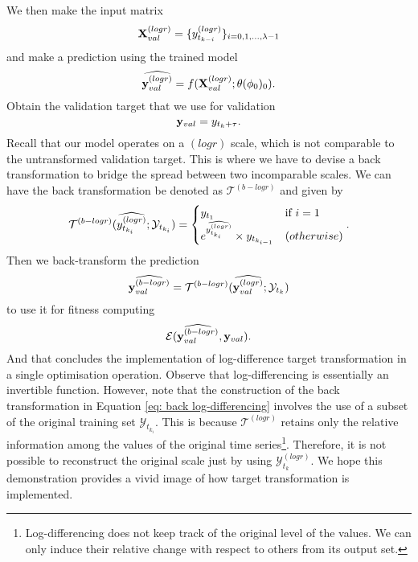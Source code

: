 We then make the input matrix
\begin{equation*}
    \mathbf{X}^{(logr)}_{val} = \{y^{(logr)}_{t_{k-i}} \}_{i = 0, 1, \ldots, \lambda-1}
\end{equation*}
and make a prediction using the trained model
\begin{equation*}
    \widehat{\mathbf{y}^{(logr)}_{val}} = f(\mathbf{X}^{(logr)}_{val} ; \theta(\phi_0)_0).
\end{equation*}
Obtain the validation target that we use for validation
\begin{equation*}
    \mathbf{y}_{val} = y_{t_k + \tau}.
\end{equation*}
Recall that our model operates on a $(logr)$ scale, which is not comparable to the untransformed validation target. This is where we have to devise a back transformation to bridge the spread between two incomparable scales. We can have the back transformation be denoted as $\mathcal{T}^{(b-logr)}$ and given by
\begin{equation}\label{eq: back log-differencing}
    \mathcal{T}^{(b-logr)}(\widehat{y^{(logr)}_{t_{k_i}}} ;\mathcal{Y}_{t_{k_i}}) =
    \begin{cases}
        y_{t_1}                                                   &\text{if $i = 1$} \\
        e^{\widehat{y^{(logr)}_{t_{k_i}}}} \times y_{t_{k_{i-1}}} &\text(otherwise)
    \end{cases}.
\end{equation}
Then we back-transform the prediction
\begin{equation*}
    \widehat{\mathbf{y}^{(b-logr)}_{val}} = \mathcal{T}^{(b-logr)}(\widehat{\mathbf{y}^{(logr)}_{val}} ;\mathcal{Y}_{t_k})
\end{equation*}
to use it for fitness computing
\begin{equation*}
    \mathcal{E}(\widehat{\mathbf{y}^{(b-logr)}_{val}}, \mathbf{y}_{val}).
\end{equation*}
And that concludes the implementation of log-difference target transformation in a single optimisation operation. Observe that log-differencing is essentially an invertible function. However, note that the construction of the back transformation in Equation \ref{eq: back log-differencing} involves the use of a subset of the original training set $\mathcal{Y}_{t_{k_i}}$. This is because $\mathcal{T}^{(logr)}$ retains only the relative information among the values of the original time series\footnote{Log-differencing does not keep track of the original level of the values. We can only induce their relative change with respect to others from its output set.}. Therefore, it is not possible to reconstruct the original scale just by using $\mathcal{Y}^{(logr)}_{t_k}$. We hope this demonstration provides a vivid image of how target transformation is implemented.

